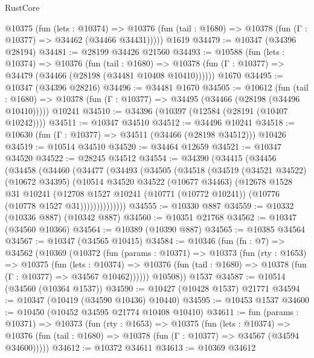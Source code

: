 \begin{lexlean}{RustCore}
\begin{coremodule}
    @10375
      (fun (lets : @10374) =>
      @10376 (fun (tail : @1680) => @10378 (fun (Γ : @10377) => @34462 (@34466 @34431)))))
    @1619
@34479 := @10347 (@34396 @28194)
@34481 := @28199 @34426 @21560
@34493 := @10588
    (fun (lets : @10374) =>
    @10376
      (fun (tail : @1680) =>
      @10378 (fun (Γ : @10377) => @34479 (@34466 (@28198 (@34481 @10408 @10410))))))
    @1670
@34495 := @10347 (@34396 @28216)
@34496 := @34481 @1670
@34505 := @10612
    (fun (tail : @1680) => @10378 (fun (Γ : @10377) => @34495 (@34466 (@28198 (@34496 @10410)))))
    @10241
@34510 := @34396 (@10397 (@12584 (@28191 (@10407 @10242))))
@34511 := @10347 @34510
@34512 := @34496 @10241
@34518 := @10630 (fun (Γ : @10377) => @34511 (@34466 (@28198 @34512))) @10426
@34519 := @10514 @34510
@34520 := @34464 @12659
@34521 := @10347 @34520
@34522 := @28245 @34512
@34554 := @34390
    (@34415
      (@34456
        (@34458
          (@34460
            (@34477
              (@34493
                (@34505
                  (@34518
                    (@34519
                      (@34521 @34522)
                      (@10672 @34395)
                      (@10514
                        @34520
                        @34522
                        (@10677 @34463)
                        (@12678
                          @1528
                          @31
                          @10241
                          (@12708
                            @1527
                            @10241
                            (@10771 (@10772 @10241))
                            (@10776 (@10778 @1527 @31))))))))))))))
@34555 := @10330 @887
@34559 := @10332 (@10336 @887) (@10342 @887)
@34560 := @10351 @21768
@34562 := @10347 (@34560 @10366)
@34564 := @10389 (@10390 @887)
@34565 := @10385 @34564
@34567 := @10347 (@34565 @10415)
@34584 := @10346
    (fun (fn : @7) =>
    @34562
      (@10369
        (@10372
          (fun (params : @10371) =>
          @10373
            (fun (rty : @1653) =>
            @10375
              (fun (lets : @10374) =>
              @10376 (fun (tail : @1680) => @10378 (fun (Γ : @10377) => @34567 @10462))))))
        @10508))
    @1537
@34587 := @10514 (@34560 (@10364 @1537))
@34590 := @10427 (@10428 @1537) @21771
@34594 := @10347 (@10419 (@34590 @10436) @10440)
@34595 := @10453 @1537
@34600 := @10450 (@10452 @34595 @21774 @10408 @10410)
@34611 := fun (params : @10371) =>
  @10373
    (fun (rty : @1653) =>
    @10375
      (fun (lets : @10374) =>
      @10376 (fun (tail : @1680) => @10378 (fun (Γ : @10377) => @34567 (@34594 @34600)))))
@34612 := @10372 @34611
@34613 := @10369 @34612

\end{coremodule}
\end{lexlean}
